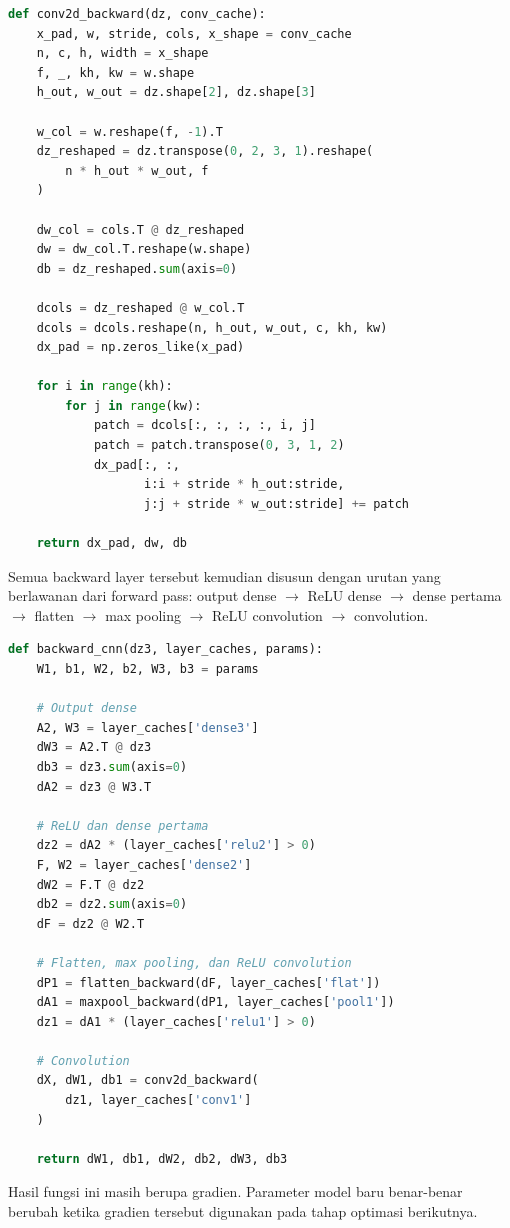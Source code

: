 \documentclass[12pt, letterpaper]{article}
\begin{document}
\begin{lstlisting}[language=Python, caption=Backward layer convolution]
def conv2d_backward(dz, conv_cache):
    x_pad, w, stride, cols, x_shape = conv_cache
    n, c, h, width = x_shape
    f, _, kh, kw = w.shape
    h_out, w_out = dz.shape[2], dz.shape[3]

    w_col = w.reshape(f, -1).T
    dz_reshaped = dz.transpose(0, 2, 3, 1).reshape(
        n * h_out * w_out, f
    )

    dw_col = cols.T @ dz_reshaped
    dw = dw_col.T.reshape(w.shape)
    db = dz_reshaped.sum(axis=0)

    dcols = dz_reshaped @ w_col.T
    dcols = dcols.reshape(n, h_out, w_out, c, kh, kw)
    dx_pad = np.zeros_like(x_pad)

    for i in range(kh):
        for j in range(kw):
            patch = dcols[:, :, :, :, i, j]
            patch = patch.transpose(0, 3, 1, 2)
            dx_pad[:, :,
                   i:i + stride * h_out:stride,
                   j:j + stride * w_out:stride] += patch

    return dx_pad, dw, db
\end{lstlisting}

Semua backward layer tersebut kemudian disusun dengan urutan yang berlawanan dari forward pass: output dense $\rightarrow$ ReLU dense $\rightarrow$ dense pertama $\rightarrow$ flatten $\rightarrow$ max pooling $\rightarrow$ ReLU convolution $\rightarrow$ convolution.

\begin{lstlisting}[language=Python, caption=Urutan backpropagation seluruh CNN]
def backward_cnn(dz3, layer_caches, params):
    W1, b1, W2, b2, W3, b3 = params

    # Output dense
    A2, W3 = layer_caches['dense3']
    dW3 = A2.T @ dz3
    db3 = dz3.sum(axis=0)
    dA2 = dz3 @ W3.T

    # ReLU dan dense pertama
    dz2 = dA2 * (layer_caches['relu2'] > 0)
    F, W2 = layer_caches['dense2']
    dW2 = F.T @ dz2
    db2 = dz2.sum(axis=0)
    dF = dz2 @ W2.T

    # Flatten, max pooling, dan ReLU convolution
    dP1 = flatten_backward(dF, layer_caches['flat'])
    dA1 = maxpool_backward(dP1, layer_caches['pool1'])
    dz1 = dA1 * (layer_caches['relu1'] > 0)

    # Convolution
    dX, dW1, db1 = conv2d_backward(
        dz1, layer_caches['conv1']
    )

    return dW1, db1, dW2, db2, dW3, db3
\end{lstlisting}
Hasil fungsi ini masih berupa gradien. Parameter model baru benar-benar berubah ketika gradien tersebut digunakan pada tahap optimasi berikutnya.
\end{document}
